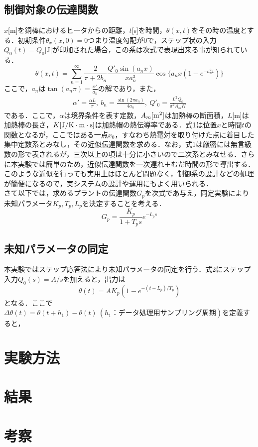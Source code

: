 \documentclass[11pt,a4paper]{jsarticle}
\begin{document}
  \subsection{制御対象の伝達関数}
  $x$[m]を銅棒におけるヒータからの距離，$t$[s]を時間，$\theta(x,t)$をその時の温度とする．初期条件$\theta_x(x,0) = 0$つまり温度勾配が$0$で，ステップ状の入力$Q_0(t) = Q_0$[J]が印加された場合，この系は次式で表現出来る事が知られている．
  \begin{equation}
   \theta(x,t) = \sum_{n = 1}^{\infty} 
    \frac{2}{\pi + 2b_n} 
    \frac{Q'_0 \sin(a_n x)}{x a_n^3} 
    \cos \{ a_n x(1-e^{-a_n^2 t}) \}
  \end{equation}
  ここで，$a_n$は$\tan(a_n \pi) = \frac{\alpha '}{a_n}$の解であり，また，
  \begin{eqnarray*}
   \alpha ' = \frac{\alpha L}{\pi}, \ b_n = \frac{\sin(2\pi a_n)}{4a_n}, \ Q'_0 = \frac{L^2 Q_0}{\pi^2 A_m K}
  \end{eqnarray*}
  である．ここで，$\alpha$は境界条件を表す定数，$A_m[{\rm m^2}]$は加熱棒の断面積，$L$[m]は加熱棒の長さ，$K[{\rm J/K \cdot m \cdot s}]$は加熱帽の熱伝導率である．式1は位置$x$と時間$t$の関数となるが，ここではある一点$x_0$，すなわち熱電対を取り付けた点に着目した集中定数系とみなし，その近似伝達関数を求める．なお，式1は厳密には無言級数の形で表されるが，三次以上の項は十分に小さいので二次系とみなせる．さらに本実験では簡単のため，近似伝達関数を一次遅れ＋むだ時間の形で導出する．このような近似を行っても実用上はほとんど問題なく，制御系の設計などの処理が簡便になるので，実システムの設計や運用にもよく用いられる．\\
  さて以下では，求めるプラントの伝達関数$G_p$を次式であ与え，同定実験により未知パラメータ$K_p,T_p,L_p$を決定することを考える．
  \begin{equation}
   G_p = \frac{K_p}{1+T_p s} e^{-L_p s}
  \end{equation}

  \subsection{未知パラメータの同定}
  本実験ではステップ応答法により未知パラメータの同定を行う．式2にステップ入力$Q_0(s) = A/s$を加えると，出力は
\begin{equation}
 \theta (t) = A K_p \left(1-e^{-(t-L_p)/T_p}\right)
\end{equation}
となる．ここで$\Delta \theta (t) = \theta(t + h_1) - \theta(t) \ (h_1：データ処理用サンプリング周期)$を定義すると，
\section{実験方法}
\section{結果}
\section{考察}
\end{document}
